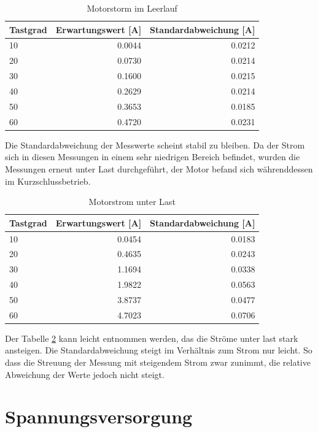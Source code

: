\begin{table}[H]
  \centering
  \begin{tabularx}{\textwidth}{|X|r|r|}
    \hline
    Tastgrad & Erwartungswert [A] & Standardabweichung [A]  \\ \hline \hline
    10 & 0.0044 & 0.0212\\ \hline
    20 & 0.0730 & 0.0214\\ \hline
    30 & 0.1600 & 0.0215\\ \hline
    40 & 0.2629 & 0.0214\\ \hline
    50 & 0.3653 & 0.0185\\ \hline
    60 & 0.4720 & 0.0231\\ \hline

  \end{tabularx}
  \caption{Motorstorm im Leerlauf}%
  \label{tab:current_noload}
\end{table}

Die Standardabweichung der Messwerte scheint stabil zu bleiben. Da der Strom sich in diesen Messungen in einem sehr niedrigen Bereich befindet, wurden
die Messungen erneut unter Last durchgeführt, der Motor befand sich währenddessen im Kurzschlussbetrieb.

\begin{table}[H]
  \centering
  \begin{tabularx}{\textwidth}{|X|r|r|}
    \hline
    Tastgrad & Erwartungswert [A] & Standardabweichung [A]  \\ \hline \hline
    10 & 0.0454 & 0.0183\\ \hline
    20 & 0.4635 & 0.0243\\ \hline
    30 & 1.1694 & 0.0338\\ \hline
    40 & 1.9822 & 0.0563\\ \hline
    50 & 3.8737 & 0.0477\\ \hline
    60 & 4.7023 & 0.0706\\ \hline
  \end{tabularx}
  \caption{Motorstrom unter Last}%
  \label{tab:current_load}
\end{table}

Der Tabelle \ref{tab:current_load} kann leicht entnommen werden, das die Ströme unter last stark ansteigen. Die Standardabweichung steigt im Verhältnis zum Strom nur leicht.
So dass die Streuung der Messung mit steigendem Strom zwar zunimmt, die relative Abweichung der Werte jedoch nicht steigt.


\section{Spannungsversorgung}

